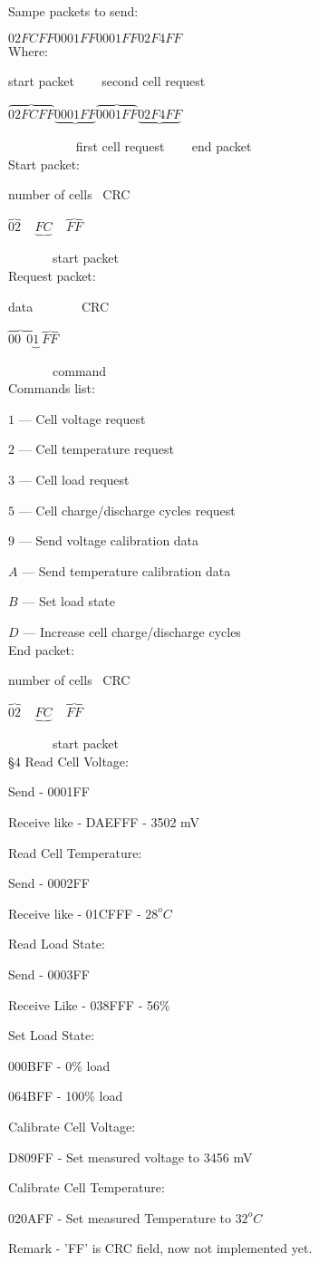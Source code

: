 \documentclass{article}
\begin{document}
Sampe packets to send:

$02FCFF 0001FF 0001FF 02F4FF$\\

Where:

start packet ~~~ second cell request

$\overbrace{02FCFF} \underbrace{0001FF} \overbrace{0001FF} \underbrace{02F4FF}$

~~~~~~~~~~ first cell request ~~~ end packet\\

Start packet:

number of cells~ CRC

$\overbrace{02}~~~~~\underbrace{FC}~~~~~\overbrace{FF}$

~~~~~~~start packet\\

Request packet:

data~~~~~~~ CRC

$\overbrace{00~~0}\underbrace{1}~\overbrace{FF}$

~~~~~~~command\\

Commands list:

$1$ --- Cell voltage request

$2$ --- Cell temperature request

$3$ --- Cell load request

$5$ --- Cell charge/discharge cycles request

$9$ --- Send voltage calibration data

$A$ --- Send temperature calibration data

$B$ --- Set load state 

$D$ --- Increase cell charge/discharge cycles\\

End packet:

number of cells~ CRC

$\overbrace{02}~~~~~\underbrace{FC}~~~~~\overbrace{FF}$

~~~~~~~start packet\\


\S 4 Read Cell Voltage:

Send - 0001FF

Receive like - DAEFFF - 3502 mV

Read Cell Temperature:

Send - 0002FF

Receive like - 01CFFF - $28 ^{o}C$

Read Load State:

Send - 0003FF

Receive Like - 038FFF - 56\%

Set Load State:

000BFF - 0\% load

064BFF - 100\% load

Calibrate Cell Voltage:

D809FF - Set measured voltage to 3456 mV

Calibrate Cell Temperature:

020AFF - Set measured Temperature to $32 ^{o}C$


Remark - 'FF' is CRC field, now not implemented yet.
\end{document}
